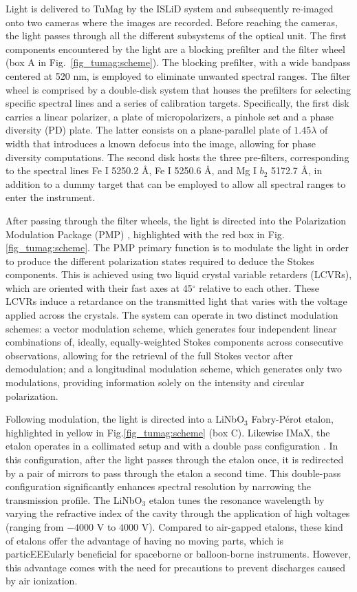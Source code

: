 Light is delivered to TuMag by the ISLiD system and subsequently re-imaged onto two cameras where the images are recorded. Before reaching the cameras, the light passes through all the different subsystems of the optical unit. The first components encountered by the light are a blocking prefilter and the filter wheel (box A in Fig.~\ref{fig_tumag:scheme}). The blocking prefilter, with a wide bandpass centered at 520 nm, is employed to eliminate unwanted spectral ranges. The filter wheel is comprised by a double-disk system \citep{filter-wheels} that houses the prefilters for selecting specific spectral lines and a series of calibration targets. Specifically, the first disk carries a linear polarizer, a plate of micropolarizers, a pinhole set and a phase diversity (PD) plate. The latter consists on a plane-parallel plate of $1.45 \lambda$ of width \citep{fran-pd} that introduces a known defocus into the image, allowing for phase diversity computations. The second disk hosts the three pre-filters, corresponding to the spectral lines Fe I 5250.2 \r{A}, Fe I 5250.6 \r{A}, and Mg I $b_2$ 5172.7 \r{A}, in addition to a dummy target that can be employed to allow all spectral ranges to enter the instrument.

After passing through the filter wheels, the light is directed into the Polarization Modulation Package (PMP) \citep{pmp1}, highlighted with the red box in Fig.\ref{fig_tumag:scheme}. The PMP primary function is to modulate the light in order to produce the different polarization states required to deduce the Stokes components. This is achieved using two liquid crystal variable retarders (LCVRs), which are oriented with their fast axes at 45$^\circ$ relative to each other. These LCVRs induce a retardance on the transmitted light that varies with the voltage applied across the crystals. The system can operate in two distinct modulation schemes: a vector modulation scheme, which generates four independent linear combinations of, ideally, equally-weighted Stokes components across consecutive observations, allowing for the retrieval of the full Stokes vector after demodulation; and a longitudinal modulation scheme, which generates only two modulations, providing information solely on the intensity and circular polarization.

Following modulation, the light is directed into a LiNbO$_3$ Fabry-Pérot etalon, highlighted in yellow in Fig.\ref{fig_tumag:scheme} (box C). Likewise IMaX, the etalon operates in a collimated setup and with a double pass configuration \citep{etalon-doublepass}. In this configuration, after the light passes through the etalon once, it is redirected by a pair of mirrors to pass through the etalon a second time. This double-pass configuration significantly enhances spectral resolution by narrowing the transmission profile. The LiNbO$_3$ etalon tunes the resonance wavelength by varying the refractive index of the cavity through the application of high voltages (ranging from $-4000$ V to $4000$ V). Compared to air-gapped etalons, these kind of etalons offer the advantage of having no moving parts, which is particEEEularly beneficial for spaceborne or balloon-borne instruments. However, this advantage comes with the need for precautions to prevent discharges caused by air ionization.

